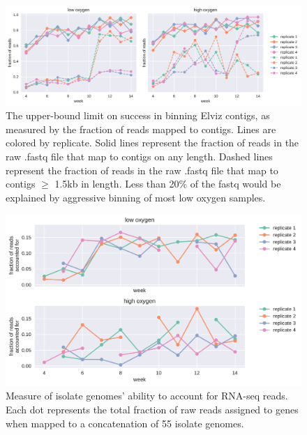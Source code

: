 \begin{figure}[H]
\centering
    \includegraphics[width=1.0\textwidth]{./tex/chapter2/figures/170314_Elviz_is_not_for_binning--landscape.pdf}  %
    \begin{singlespace}
    \caption[Upper-bound limit on success of binning Elviz contigs.]{
        The upper-bound limit on success in binning Elviz contigs, as measured by the fraction of reads mapped to contigs.
        Lines are colored by replicate.
        Solid lines represent the fraction of reads in the raw .fastq file that map to contigs on any length.
        Dashed lines represent the fraction of reads in the raw .fastq file that map to contigs $\geq$ 1.5kb in length.
        Less than 20\% of the fastq would be explained by aggressive binning of most low oxygen samples.}
    \label{fig:dont_bin_Elviz}
    \end{singlespace}
\end{figure}


\begin{figure}[H]
\centering
    \includegraphics[width=1.0\textwidth]{./tex/chapter2/figures/170208_fraction_of_transcriptome_reads_mapped_to_isolates.pdf}
    \begin{singlespace}
    \caption[Measure of isolate genomes' ability to account for RNA-seq reads.]{
        Measure of isolate genomes' ability to account for RNA-seq reads.
        Each dot represents the total fraction of raw reads assigned to genes when mapped to a concatenation of 55 isolate genomes.
        }
    \label{fig:isolate_RNAseq}
    \end{singlespace}
\end{figure}


